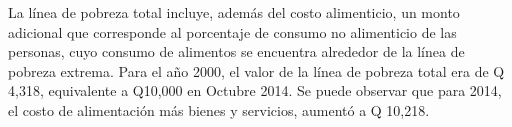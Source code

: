 La línea de pobreza total incluye, además del costo alimenticio, un monto adicional que corresponde al porcentaje de consumo no alimenticio de las personas, cuyo consumo de alimentos se encuentra alrededor de la línea de pobreza extrema. Para el año 2000, el valor de la línea de pobreza total era de Q 4,318, equivalente a Q10,000 en Octubre 2014. Se puede observar que para 2014, el costo de alimentación más bienes y servicios, aumentó a Q 10,218.